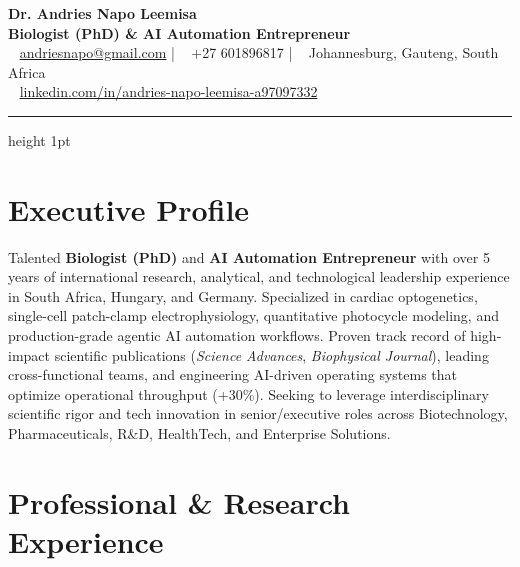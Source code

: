 \documentclass[10pt,a4paper]{article}
\begin{document}
\begin{center}
    {\Huge \textbf{\color{primary} Dr. Andries Napo Leemisa}} \\[4pt]
    {\large \textbf{\color{secondary} Biologist (PhD) \& AI Automation Entrepreneur}} \\[6pt]
    \small
    \faEnvelope~ \href{mailto:andriesnapo@gmail.com}{andriesnapo@gmail.com} \quad|\quad
    \faPhone~ +27 601896817 \quad|\quad
    \faMapMarkerAlt~ Johannesburg, Gauteng, South Africa \\[3pt]
    \faLinkedin~ \href{https://linkedin.com/in/andries-napo-leemisa-a97097332}{linkedin.com/in/andries-napo-leemisa-a97097332}
\end{center}
\vspace{-8pt}
\hrule height 1pt \color{primary}
\vspace{6pt}

\section{Executive Profile}
Talented \textbf{Biologist (PhD)} and \textbf{AI Automation Entrepreneur} with over 5 years of international research, analytical, and technological leadership experience in South Africa, Hungary, and Germany. Specialized in cardiac optogenetics, single-cell patch-clamp electrophysiology, quantitative photocycle modeling, and production-grade agentic AI automation workflows. Proven track record of high-impact scientific publications (\textit{Science Advances}, \textit{Biophysical Journal}), leading cross-functional teams, and engineering AI-driven operating systems that optimize operational throughput (+30\%). Seeking to leverage interdisciplinary scientific rigor and tech innovation in senior/executive roles across Biotechnology, Pharmaceuticals, R\&D, HealthTech, and Enterprise Solutions.

\section{Professional \& Research Experience}
\end{document}
